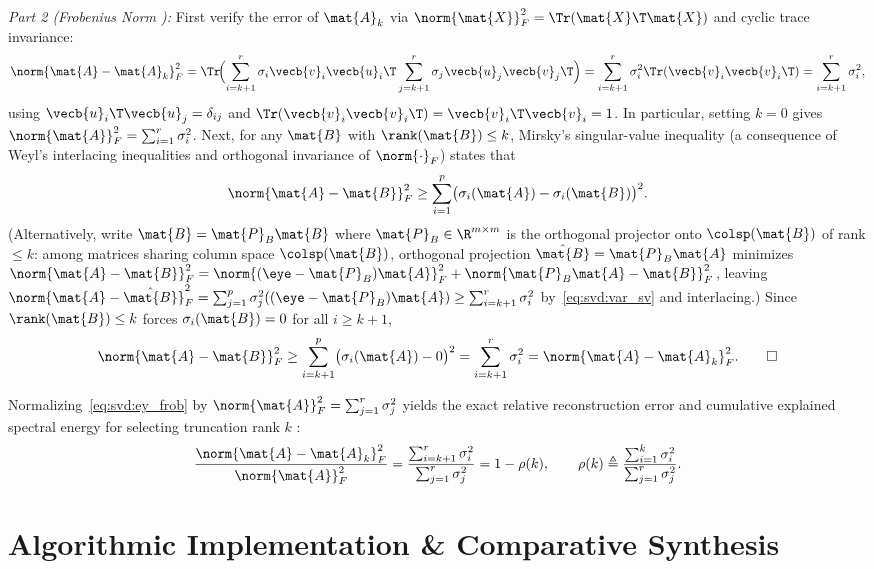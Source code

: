 \documentclass[../../../../master.tex]{subfiles}
\begin{document}
\begin{coremath}
\emph{Part 2 (Frobenius Norm ):} First verify the error of $\mat{A}_k$ via $\norm{\mat{X}}_F^2 = \Tr(\mat{X}\T\mat{X})$ and cyclic trace invariance:
\[
  \norm{\mat{A} - \mat{A}_k}_F^2
  = \Tr\!\Bigl(\sum_{i=k+1}^r \sigma_i \vecb{v}_i\vecb{u}_i\T \sum_{j=k+1}^r \sigma_j \vecb{u}_j\vecb{v}_j\T\Bigr)
  = \sum_{i=k+1}^r \sigma_i^2 \Tr(\vecb{v}_i\vecb{v}_i\T)
  = \sum_{i=k+1}^r \sigma_i^2,
\]
using $\vecb{u}_i\T\vecb{u}_j = \delta_{ij}$ and $\Tr(\vecb{v}_i\vecb{v}_i\T) = \vecb{v}_i\T\vecb{v}_i = 1$. In particular, setting $k=0$ gives $\norm{\mat{A}}_F^2 = \sum_{i=1}^r \sigma_i^2$. Next, for any $\mat{B}$ with $\rank(\mat{B}) \le k$, Mirsky's singular-value inequality (a consequence of Weyl's interlacing inequalities and orthogonal invariance of $\norm{\cdot}_F$) states that
\[
  \norm{\mat{A} - \mat{B}}_F^2 \ge \sum_{i=1}^p \bigl(\sigma_i(\mat{A}) - \sigma_i(\mat{B})\bigr)^2.
\]
(Alternatively, write $\mat{B} = \mat{P}_B\mat{B}$ where $\mat{P}_B \in \R^{m\times m}$ is the orthogonal projector onto $\colsp(\mat{B})$ of rank $\le k$: among matrices sharing column space $\colsp(\mat{B})$, orthogonal projection $\hat{\mat{B}} = \mat{P}_B\mat{A}$ minimizes $\norm{\mat{A}-\mat{B}}_F^2 = \norm{(\eye-\mat{P}_B)\mat{A}}_F^2 + \norm{\mat{P}_B\mat{A}-\mat{B}}_F^2$, leaving $\norm{\mat{A}-\hat{\mat{B}}}_F^2 = \sum_{j=1}^p \sigma_j^2((\eye-\mat{P}_B)\mat{A}) \ge \sum_{i=k+1}^r \sigma_i^2$ by~\eqref{eq:svd:var_sv} and interlacing.) Since $\rank(\mat{B}) \le k$ forces $\sigma_i(\mat{B}) = 0$ for all $i \ge k+1$,
\[
  \norm{\mat{A} - \mat{B}}_F^2 \ge \sum_{i=k+1}^p \bigl(\sigma_i(\mat{A}) - 0\bigr)^2 = \sum_{i=k+1}^r \sigma_i^2 = \norm{\mat{A} - \mat{A}_k}_F^2. \qed
\]
\end{coremath}

Normalizing~\eqref{eq:svd:ey_frob} by $\norm{\mat{A}}_F^2 = \sum_{j=1}^r \sigma_j^2$ yields the exact relative reconstruction error and cumulative explained spectral energy for selecting truncation rank $k$ :
\begin{equation}
\label{eq:svd:rel_energy}
  \frac{\norm{\mat{A} - \mat{A}_k}_F^2}{\norm{\mat{A}}_F^2} = \frac{\sum_{i=k+1}^r \sigma_i^2}{\sum_{j=1}^r \sigma_j^2} = 1 - \rho(k),
  \qquad \rho(k) \triangleq \frac{\sum_{i=1}^k \sigma_i^2}{\sum_{j=1}^r \sigma_j^2}.
\end{equation}

\section{Algorithmic Implementation \& Comparative Synthesis}
\label{sec:svd:algorithms}
\end{document}
